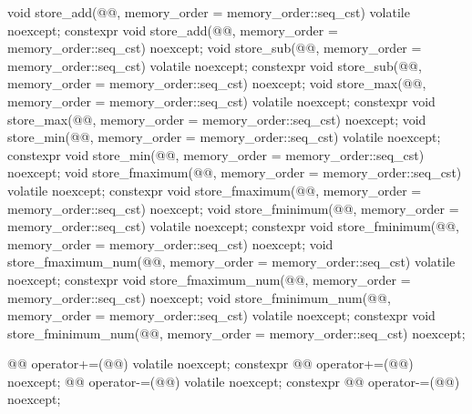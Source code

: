 \begin{codeblock}
{{    void store_add(@@,
                   memory_order = memory_order::seq_cst) volatile noexcept;
    constexpr void store_add(@@,
                             memory_order = memory_order::seq_cst) noexcept;
    void store_sub(@@,
                   memory_order = memory_order::seq_cst) volatile noexcept;
    constexpr void store_sub(@@,
                             memory_order = memory_order::seq_cst) noexcept;
    void store_max(@@,
                   memory_order = memory_order::seq_cst) volatile noexcept;
    constexpr void store_max(@@,
                             memory_order = memory_order::seq_cst) noexcept;
    void store_min(@@,
                   memory_order = memory_order::seq_cst) volatile noexcept;
    constexpr void store_min(@@,
                             memory_order = memory_order::seq_cst) noexcept;
    void store_fmaximum(@@,
                        memory_order = memory_order::seq_cst) volatile noexcept;
    constexpr void store_fmaximum(@@,
                                  memory_order = memory_order::seq_cst) noexcept;
    void store_fminimum(@@,
                        memory_order = memory_order::seq_cst) volatile noexcept;
    constexpr void store_fminimum(@@,
                                  memory_order = memory_order::seq_cst) noexcept;
    void store_fmaximum_num(@@,
                            memory_order = memory_order::seq_cst) volatile noexcept;
    constexpr void store_fmaximum_num(@@,
                                      memory_order = memory_order::seq_cst) noexcept;
    void store_fminimum_num(@@,
                            memory_order = memory_order::seq_cst) volatile noexcept;
    constexpr void store_fminimum_num(@@,
                                      memory_order = memory_order::seq_cst) noexcept;

    @@ operator+=(@@) volatile noexcept;
    constexpr @@ operator+=(@@) noexcept;
    @@ operator-=(@@) volatile noexcept;
    constexpr @@ operator-=(@@) noexcept;

}}
\end{codeblock}
